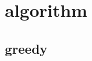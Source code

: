 %         
%         
    
%         

        
\section{algorithm}
    \subsection{greedy}
         \columnbreak
    
